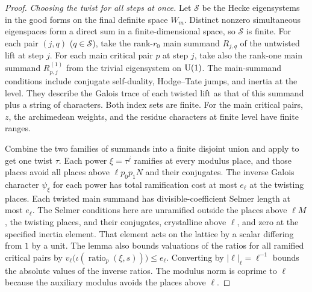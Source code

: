 \begin{proof}
\emph{Choosing the twist for all steps at once.}
Let $\mathcal S$ be the Hecke eigensystems in the good forms on the final definite space $W_m$. Distinct nonzero simultaneous eigenspaces form a direct sum in a finite-dimensional space, so $\mathcal S$ is finite.
For each pair $(j,q)$ ($q\in\mathcal S$), take the rank-$r_0$ main summand $R_{j,q}$ of the untwisted lift at step $j$. For each main critical pair $p$ at step $j$, take also the rank-one main summand $R_{p,j}^{(1)}$ from the trivial eigensystem on $\operatorname{U}(1)$.
The main-summand conditions include conjugate self-duality, Hodge--Tate jumps, and inertia at the level. They describe the Galois trace of each twisted lift as that of this summand plus a string of characters.
Both index sets are finite. For the main critical pairs, $z$, the archimedean weights, and the residue characters at finite level have finite ranges.

Combine the two families of summands into a finite disjoint union and apply  to get one twist $\tau$. Each power $\xi=\tau^j$ ramifies at every modulus place, and those places avoid all places above $\ell p_0p_1N$ and their conjugates. The inverse Galois character $\psi_\xi$ for each power has total ramification cost at most $e_\ell$ at the twisting places. Each twisted main summand has divisible-coefficient Selmer length at most $e_\ell$.
The Selmer conditions here are unramified outside the places above $\ell M$, the twisting places, and their conjugates, crystalline above $\ell$, and zero at the specified inertia element. That element acts on the lattice by a scalar differing from $1$ by a unit.
The lemma also bounds valuations of the ratios for all ramified critical pairs by $v_\ell\bigl(\iota(\operatorname{ratio}_p(\xi,s))\bigr)\le e_\ell$. Converting by $|\ell|_\ell=\ell^{-1}$ bounds the absolute values of the inverse ratios. The modulus norm is coprime to $\ell$ because the auxiliary modulus avoids the places above $\ell$.


\end{proof}
